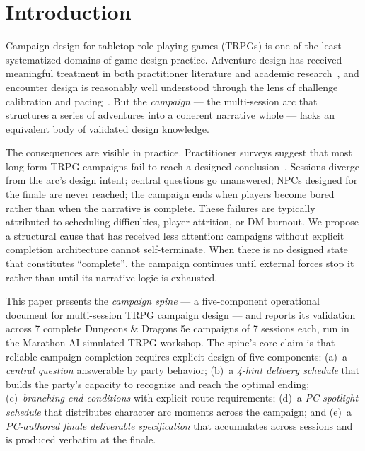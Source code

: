 
\section{Introduction}
\label{sec:introduction}

Campaign design for tabletop role-playing games (TRPGs) is one of the least
systematized domains of game design practice. Adventure design has received
meaningful treatment in both practitioner literature and academic
research~\cite{tychsen2006role, dormans2010}, and encounter design is reasonably
well understood through the lens of challenge calibration and
pacing~\cite{dungeons2014players}. But the \textit{campaign} --- the multi-session arc
that structures a series of adventures into a coherent narrative whole --- lacks an
equivalent body of validated design knowledge.

The consequences are visible in practice. Practitioner surveys suggest that most
long-form TRPG campaigns fail to reach a designed conclusion~\cite{perkins2017dungeon}.
Sessions diverge from the arc's design intent; central questions go unanswered;
NPCs designed for the finale are never reached; the campaign ends when players
become bored rather than when the narrative is complete. These failures are typically
attributed to scheduling difficulties, player attrition, or DM burnout. We propose
a structural cause that has received less attention: campaigns without explicit
completion architecture cannot self-terminate. When there is no designed state
that constitutes ``complete'', the campaign continues until external forces stop
it rather than until its narrative logic is exhausted.

This paper presents the \textit{campaign spine} --- a five-component operational
document for multi-session TRPG campaign design --- and reports its validation
across 7 complete Dungeons \& Dragons 5e campaigns of 7 sessions each, run in the
Marathon AI-simulated TRPG workshop. The spine's core claim is that reliable
campaign completion requires explicit design of five components:
(a)~a \textit{central question} answerable by party behavior;
(b)~a \textit{4-hint delivery schedule} that builds the party's capacity to
recognize and reach the optimal ending;
(c)~\textit{branching end-conditions} with explicit route requirements;
(d)~a \textit{PC-spotlight schedule} that distributes character arc moments
across the campaign; and
(e)~a \textit{PC-authored finale deliverable specification} that accumulates
across sessions and is produced verbatim at the finale.

